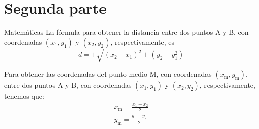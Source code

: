 \documentclass{beamer}
\begin{document}
	\section{Segunda parte}
	\begin{frame}{Matemáticas}
		La fórmula para obtener la distancia entre dos puntos A y B, con coordenadas \((x_1, y_1)\) y \((x_2, y_2)\), respectivamente, es 
		\begin{equation}
		d=\pm\sqrt{(x_{2}-x_{1})^2+(y_{2}-y_{1}^2)}
		\end{equation}
		
		Para obtener las coordenadas del punto medio M, con coordenadas \((x_\mathrm{m}, y_\mathrm{m})\),  entre dos puntos A y B, con coordenadas \((x_1, y_1)\) y \((x_2, y_2)\), respectivamente, tenemos que:
		\begin{align}
			x_\mathrm{m} = \frac{x_1+x_2}{2} \\
			y_\mathrm{m} = \frac{y_1+y_2}{2} 
		\end{align}
	\end{frame}
\end{document}
